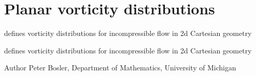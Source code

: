 \hypertarget{group___plane_vorticity}{\section{Planar vorticity distributions}
\label{group___plane_vorticity}
}


defines vorticity distributions for incompressible flow in 2d Cartesian geometry  


defines vorticity distributions for incompressible flow in 2d Cartesian geometry 

\begin{DoxyAuthor}{Author}
Peter Bosler, Department of Mathematics, University of Michigan 
\end{DoxyAuthor}

